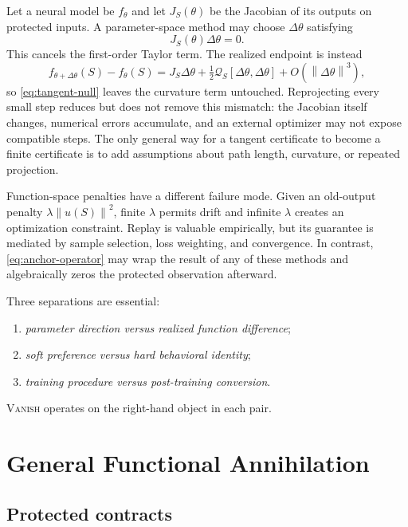 \documentclass{vanish_ieee}
\theoremstyle{definition}
\newcommand{\norm}[1]{\left\lVert#1\right\rVert}
\newcommand{\VANISH}{\textsc{Vanish}}
\begin{document}
Let a neural model be $f_\theta$ and let $J_S(\theta)$ be the Jacobian of its outputs on protected inputs.  A parameter-space method may choose $\Delta\theta$ satisfying
\begin{equation}
J_S(\theta)\Delta\theta=0.
\label{eq:tangent-null}
\end{equation}
This cancels the first-order Taylor term.  The realized endpoint is instead
\begin{equation}
f_{\theta+\Delta\theta}(S)-f_\theta(S)
=J_S\Delta\theta+\tfrac{1}{2}\mathcal{Q}_S[\Delta\theta,\Delta\theta]+O(\norm{\Delta\theta}^3),
\end{equation}
so \eqref{eq:tangent-null} leaves the curvature term untouched.  Reprojecting every small step reduces but does not remove this mismatch: the Jacobian itself changes, numerical errors accumulate, and an external optimizer may not expose compatible steps.  The only general way for a tangent certificate to become a finite certificate is to add assumptions about path length, curvature, or repeated projection.

Function-space penalties have a different failure mode.  Given an old-output penalty $\lambda\norm{u(S)}^2$, finite $\lambda$ permits drift and infinite $\lambda$ creates an optimization constraint.  Replay is valuable empirically, but its guarantee is mediated by sample selection, loss weighting, and convergence.  In contrast, \eqref{eq:anchor-operator} may wrap the result of any of these methods and algebraically zeros the protected observation afterward.

Three separations are essential:
\begin{enumerate}
  \item \emph{parameter direction versus realized function difference};
  \item \emph{soft preference versus hard behavioral identity};
  \item \emph{training procedure versus post-training conversion}.
\end{enumerate}
\VANISH{} operates on the right-hand object in each pair.

\section{General Functional Annihilation}

\subsection{Protected contracts}
\end{document}
